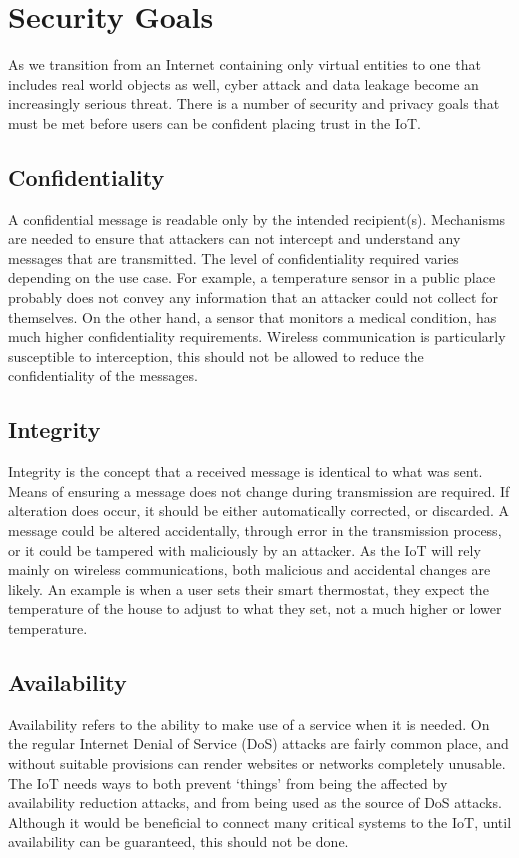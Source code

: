 \documentclass[10pt,journal,compsoc]{IEEEtran}
\begin{document}
\section{Security Goals}
As we transition from an Internet containing only virtual entities to one that
includes real world objects as well, cyber attack and data leakage become an
increasingly serious threat. There is a number of security and privacy goals that
must be met before users can be confident placing trust in the IoT.

\subsection{Confidentiality}
A confidential message is readable only by the intended recipient(s).
Mechanisms are needed to ensure that attackers can not intercept and understand
any messages that are transmitted. The level of confidentiality required varies
depending on the use case. For example, a temperature sensor in a public place
probably does not convey any information that an attacker could not collect for
themselves. On the other hand, a sensor that monitors a medical condition, has
much higher confidentiality requirements. Wireless communication is
particularly susceptible to interception, this should not be allowed to reduce
the confidentiality of the messages.  

\subsection{Integrity}
Integrity is the concept that a received message is identical to what was sent.
Means of ensuring a message does not change during transmission are required.
If alteration does occur, it should be either automatically corrected, or
discarded. A message could be altered accidentally, through error in the
transmission process, or it could be tampered with maliciously by an attacker.
As the IoT will rely mainly on wireless communications, both malicious and
accidental changes are likely. An example is when a user sets their smart
thermostat, they expect the temperature of the house to adjust to what they
set, not a much higher or lower temperature.  

\subsection{Availability}
Availability refers to the ability to make use of a service when it is needed.
On the regular Internet Denial of Service (DoS) attacks are fairly common
place, and without suitable provisions can render websites or networks
completely unusable. The IoT needs ways to both prevent `things' from being the
affected by availability reduction attacks, and from being used as the source of DoS
attacks. Although it would be beneficial to connect many critical systems to
the IoT, until availability can be guaranteed, this should not be done.
\end{document}
